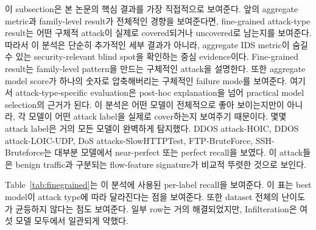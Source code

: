 \documentclass[sigconf,nonacm]{acmart}
\begin{document}
이 subsection은 본 논문의 핵심 결과를 가장 직접적으로 보여준다.
앞의 aggregate metric과 family-level result가 전체적인 경향을 보여준다면, fine-grained attack-type result는 어떤 구체적 attack이 실제로 covered되거나 uncovered로 남는지를 보여준다.
따라서 이 분석은 단순히 추가적인 세부 결과가 아니라, aggregate IDS metric이 숨길 수 있는 security-relevant blind spot을 확인하는 중심 evidence이다.
Fine-grained result는 family-level pattern을 만드는 구체적인 attack을 설명한다.
또한 aggregate model score가 하나의 숫자로 압축해버리는 구체적인 failure mode를 보여준다.
여기서 attack-type-specific evaluation은 post-hoc explanation을 넘어 practical model selection의 근거가 된다.
이 분석은 어떤 모델이 전체적으로 좋아 보이는지만이 아니라, 각 모델이 어떤 attack label을 실제로 cover하는지 보여주기 때문이다.
몇몇 attack label은 거의 모든 모델이 완벽하게 탐지했다.
DDOS attack-HOIC, DDOS attack-LOIC-UDP, DoS attacks-SlowHTTPTest, FTP-BruteForce, SSH-Bruteforce는 대부분 모델에서 near-perfect 또는 perfect recall을 보였다.
이 attack들은 benign traffic과 구분되는 flow-feature signature가 비교적 뚜렷한 것으로 보인다.

Table~\ref{tab:finegrained}는 이 분석에 사용된 per-label recall을 보여준다.
이 표는 best model이 attack type에 따라 달라진다는 점을 보여준다.
또한 dataset 전체의 난이도가 균등하지 않다는 점도 보여준다.
일부 row는 거의 해결되었지만, Infilteration은 여섯 모델 모두에서 일관되게 약했다.
\end{document}
